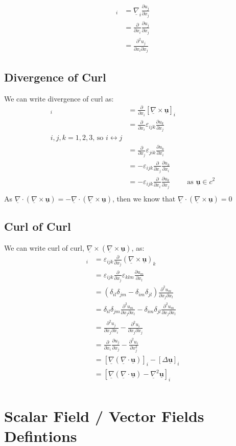 \documentclass{article}
\renewcommand{\vec}[1]{\underline{\textbf{#1}}}
\newcommand{\e}{\varepsilon}
\newcommand{\nab}{\underline{\nabla}}
\newcommand{\grad}{{\nab}\, f}
\newcommand{\pd}[2]{\frac{\partial #1}{\partial #2}}
\renewcommand{\div}{\nab \cdot}
\newcommand{\curl}{\nab \times}
\begin{document}
\begin{align*}
  [\grad \div]_i &= \nab_i \pd{u_j}{x_j} \\
  &= \pd{}{x_i}\pd{u_j}{x_j} \\
  &= \pd{^2 u_j}{x_i\partial x_j}
\end{align*}

\subsection{Divergence of Curl}
We can write divergence of curl as:
\begin{align*}
  [\div\curl\vec u]_i &= \pd{}{x_i}[\curl\vec u]_i \\
  &= \pd{}{x_i}\e_{ijk}\pd{u_k}{x_j} \\
   \text{$i, j, k = 1, 2, 3$, so $i \leftrightarrow j$}\\
  &= \pd{}{x_j}\e_{jik}\pd{u_k}{x_i} \\
  &= -\e_{ijk}\pd{}{x_j}\pd{u_k}{x_i} \\
  &= -\e_{ijk}\pd{}{x_i}\pd{u_k}{x_j} && \text{as $\vec u \in c^2$} \\
\end{align*}
As $\div(\curl\vec u) = -\div(\curl\vec u)$, then we know that $\div(\curl\vec u) = 0$

\subsection{Curl of Curl}
We can write curl of curl, $ \curl(\curl\vec u)$, as:
\begin{align*}
  [\curl(\curl\vec u)]_i &= \e_{ijk}\pd{}{x_j}(\curl\vec u)_k \\
  &= \e_{ijk}\pd{}{x_j}\e_{klm}\pd{u_m}{x_l} \\
  &= (\delta_{il}\delta_{jm} - \delta_{im}\delta_{jl})\pd{^2 u_m}{x_j\partial x_l} \\
  &= \delta_{il}\delta_{jm}\pd{^2 u_m}{x_j\partial x_l} - \delta_{im}\delta_{jl}\pd{^2 u_m}{x_j\partial x_l} \\
  &= \pd{^2 u_j}{x_j \partial x_i} - \pd{^2 u_i}{x_j \partial x_j}\\
  &= \pd{}{x_i}\pd{u_j}{x_j} - \pd{^2 u_i}{x_j^2} \\
  &= [\nab(\div\vec u)]_i - [\Delta\vec u]_i\\
  &= [\nab(\div\vec u) - \nab^2\vec u]_i\\
\end{align*}

\section{Scalar Field / Vector Fields Defintions}
\end{document}
